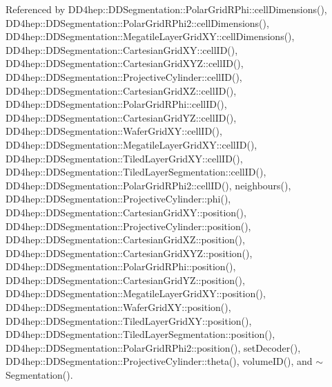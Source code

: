 Referenced by D\+D4hep\+::\+D\+D\+Segmentation\+::\+Polar\+Grid\+R\+Phi\+::cell\+Dimensions(), D\+D4hep\+::\+D\+D\+Segmentation\+::\+Polar\+Grid\+R\+Phi2\+::cell\+Dimensions(), D\+D4hep\+::\+D\+D\+Segmentation\+::\+Megatile\+Layer\+Grid\+X\+Y\+::cell\+Dimensions(), D\+D4hep\+::\+D\+D\+Segmentation\+::\+Cartesian\+Grid\+X\+Y\+::cell\+I\+D(), D\+D4hep\+::\+D\+D\+Segmentation\+::\+Cartesian\+Grid\+X\+Y\+Z\+::cell\+I\+D(), D\+D4hep\+::\+D\+D\+Segmentation\+::\+Projective\+Cylinder\+::cell\+I\+D(), D\+D4hep\+::\+D\+D\+Segmentation\+::\+Cartesian\+Grid\+X\+Z\+::cell\+I\+D(), D\+D4hep\+::\+D\+D\+Segmentation\+::\+Polar\+Grid\+R\+Phi\+::cell\+I\+D(), D\+D4hep\+::\+D\+D\+Segmentation\+::\+Cartesian\+Grid\+Y\+Z\+::cell\+I\+D(), D\+D4hep\+::\+D\+D\+Segmentation\+::\+Wafer\+Grid\+X\+Y\+::cell\+I\+D(), D\+D4hep\+::\+D\+D\+Segmentation\+::\+Megatile\+Layer\+Grid\+X\+Y\+::cell\+I\+D(), D\+D4hep\+::\+D\+D\+Segmentation\+::\+Tiled\+Layer\+Grid\+X\+Y\+::cell\+I\+D(), D\+D4hep\+::\+D\+D\+Segmentation\+::\+Tiled\+Layer\+Segmentation\+::cell\+I\+D(), D\+D4hep\+::\+D\+D\+Segmentation\+::\+Polar\+Grid\+R\+Phi2\+::cell\+I\+D(), neighbours(), D\+D4hep\+::\+D\+D\+Segmentation\+::\+Projective\+Cylinder\+::phi(), D\+D4hep\+::\+D\+D\+Segmentation\+::\+Cartesian\+Grid\+X\+Y\+::position(), D\+D4hep\+::\+D\+D\+Segmentation\+::\+Projective\+Cylinder\+::position(), D\+D4hep\+::\+D\+D\+Segmentation\+::\+Cartesian\+Grid\+X\+Z\+::position(), D\+D4hep\+::\+D\+D\+Segmentation\+::\+Cartesian\+Grid\+X\+Y\+Z\+::position(), D\+D4hep\+::\+D\+D\+Segmentation\+::\+Polar\+Grid\+R\+Phi\+::position(), D\+D4hep\+::\+D\+D\+Segmentation\+::\+Cartesian\+Grid\+Y\+Z\+::position(), D\+D4hep\+::\+D\+D\+Segmentation\+::\+Megatile\+Layer\+Grid\+X\+Y\+::position(), D\+D4hep\+::\+D\+D\+Segmentation\+::\+Wafer\+Grid\+X\+Y\+::position(), D\+D4hep\+::\+D\+D\+Segmentation\+::\+Tiled\+Layer\+Grid\+X\+Y\+::position(), D\+D4hep\+::\+D\+D\+Segmentation\+::\+Tiled\+Layer\+Segmentation\+::position(), D\+D4hep\+::\+D\+D\+Segmentation\+::\+Polar\+Grid\+R\+Phi2\+::position(), set\+Decoder(), D\+D4hep\+::\+D\+D\+Segmentation\+::\+Projective\+Cylinder\+::theta(), volume\+I\+D(), and $\sim$\+Segmentation().

\hypertarget{class_d_d4hep_1_1_d_d_segmentation_1_1_segmentation_a1e9aa1272b32dc4999584154baa72a14}{}\label{class_d_d4hep_1_1_d_d_segmentation_1_1_segmentation_a1e9aa1272b32dc4999584154baa72a14} 
